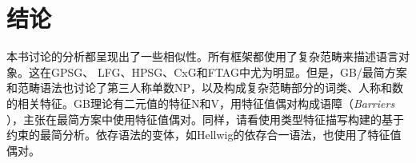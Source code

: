 \chapter{结论}

本书讨论的分析都呈现出了一些相似性。所有框架都使用了复杂范畴来描述语言对象。这在GPSG\indexgpsgc、
LFG\indexlfgc、HPSG\indexhpsgc、CxG\indexcxgc 和FTAG\indextagc 中尤为明显。但是，GB/最简方案和范畴语法也讨论了第三人称单数NP，以及构成复杂范畴部分的词类、人称和数的相关特征。GB理论有二元值的特征N和V\citep[]{Chomsky70a}，\citet[]{Stabler92a-u}用特征值偶对构成语障（\emph{Barriers} ），\citet[--291]{SE2002a}主张在最简方案\indexmpc 中使用特征值偶对。同样，请看\citet[\page]{Veenstra98a}使用类型特征描写构建的基于约束的最简分析。依存语法的变体，如Hellwig的依存合一语法，也使用了特征值偶对\citep[]{Hellwig2003a}。

